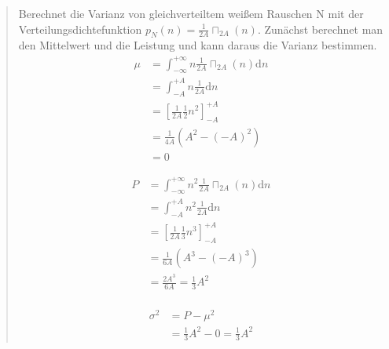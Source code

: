     \begin{quote}
    Berechnet die Varianz von gleichverteiltem weißem Rauschen N mit der
    Verteilungsdichtefunktion $p_{N}(n)=\frac{1}{2A}\sqcap_{2A}(n)$. Zunächst
    berechnet man den Mittelwert und die Leistung und kann daraus die Varianz
    bestimmen.
    \begin{equation*}
     \begin{split}
     \mu &= \int_{-\infty}^{+\infty} n \frac{1}{2A} \sqcap_{2A} (n) \mathrm dn\\
     &= \int_{-A}^{+A} n \frac{1}{2A} \mathrm dn\\
     &= \left[ \frac{1}{2A} \frac{1}{2} n^2 \right]_{-A}^{+A}\\
     &= \frac{1}{4A} (A^2-(-A)^2)\\
     &= 0
     \end{split}
    \end{equation*}
    
    \begin{equation*}
     \begin{split}
     P &= \int_{-\infty}^{+\infty} n^2 \frac{1}{2A} \sqcap_{2A} (n) \mathrm dn\\
     &= \int_{-A}^{+A} n^2 \frac{1}{2A} \mathrm dn\\
     &= \left[ \frac{1}{2A} \frac{1}{3} n^3 \right]_{-A}^{+A}\\
     &= \frac{1}{6A} (A^3-(-A)^3)\\
            &= \frac{2A^3}{6A} = \frac{1}{3} A^2\\
     \end{split}
    \end{equation*}
    
    \begin{equation*}
     \begin{split}
     \sigma^2 &= P - \mu^2\\
     &= \frac{1}{3} A^2 - 0 = \frac{1}{3} A^2
     \end{split}
    \end{equation*}
\end{quote}


